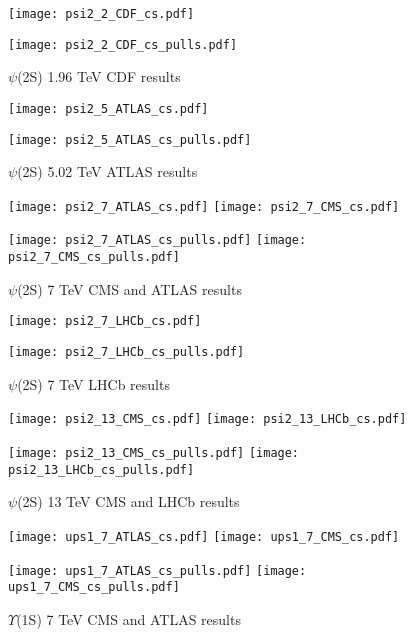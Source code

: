 \documentclass{article}
\begin{document}
\clearpage

\begin{figure}
\centering
\texttt{[image: psi2\_2\_CDF\_cs.pdf]}

\texttt{[image: psi2\_2\_CDF\_cs\_pulls.pdf]}
\caption{$\psi$(2S) 1.96 TeV CDF results}
\end{figure}

\clearpage

\begin{figure}
\centering
\texttt{[image: psi2\_5\_ATLAS\_cs.pdf]}

\texttt{[image: psi2\_5\_ATLAS\_cs\_pulls.pdf]}
\caption{$\psi$(2S) 5.02 TeV ATLAS results}
\end{figure}

\clearpage

\begin{figure}
\centering
\texttt{[image: psi2\_7\_ATLAS\_cs.pdf]}
\texttt{[image: psi2\_7\_CMS\_cs.pdf]}

\texttt{[image: psi2\_7\_ATLAS\_cs\_pulls.pdf]}
\texttt{[image: psi2\_7\_CMS\_cs\_pulls.pdf]}
\caption{$\psi$(2S) 7 TeV CMS and ATLAS results}
\end{figure}

\clearpage

\begin{figure}
\centering
\texttt{[image: psi2\_7\_LHCb\_cs.pdf]}

\texttt{[image: psi2\_7\_LHCb\_cs\_pulls.pdf]}
\caption{$\psi$(2S) 7 TeV LHCb results}
\end{figure}

\clearpage

\begin{figure}
\centering
\texttt{[image: psi2\_13\_CMS\_cs.pdf]}
\texttt{[image: psi2\_13\_LHCb\_cs.pdf]}

\texttt{[image: psi2\_13\_CMS\_cs\_pulls.pdf]}
\texttt{[image: psi2\_13\_LHCb\_cs\_pulls.pdf]}
\caption{$\psi$(2S) 13 TeV CMS and LHCb results}
\end{figure}

\clearpage

\begin{figure}
\centering
\texttt{[image: ups1\_7\_ATLAS\_cs.pdf]}
\texttt{[image: ups1\_7\_CMS\_cs.pdf]}

\texttt{[image: ups1\_7\_ATLAS\_cs\_pulls.pdf]}
\texttt{[image: ups1\_7\_CMS\_cs\_pulls.pdf]}
\caption{$\Upsilon$(1S) 7 TeV CMS and ATLAS results}
\end{figure}
\end{document}
